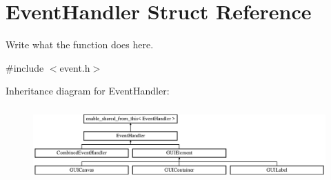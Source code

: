 \hypertarget{structEventHandler}{\section{Event\+Handler Struct Reference}
\label{structEventHandler}
}


Write what the function does here.  




{\ttfamily \#include $<$event.\+h$>$}

Inheritance diagram for Event\+Handler\+:\begin{figure}[H]
\begin{center}
\leavevmode
\includegraphics[height=2.839037cm]{structEventHandler}
\end{center}
\end{figure}
